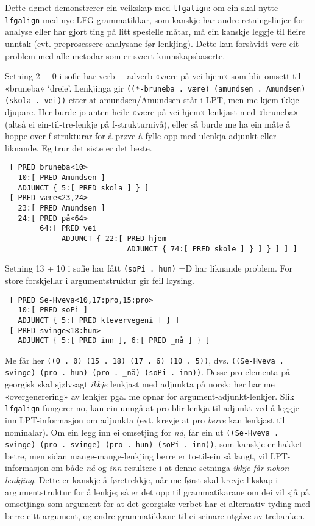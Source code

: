 \documentclass[11pt,a4paper,oneside,draft]{book}
\begin{document}
Dette dømet demonstrerer ein veikskap med \texttt{lfgalign}: om ein skal
nytte \texttt{lfgalign} med nye LFG-grammatikkar, som kanskje har andre
retningslinjer for analyse eller har gjort ting på litt spesielle
måtar, må ein kanskje leggje til fleire unntak (evt. preprosessere
analysane før lenkjing). Dette kan forsåvidt vere eit problem med alle
metodar som er svært kunnskapsbaserte.


Setning 2 + 0 i sofie har verb + adverb «være på vei hjem» som blir
omsett til «bruneba» `dreie'. Lenkjinga gir \texttt{((*-bruneba . være) (amundsen . Amundsen) (skola . vei))} etter at amundsen/Amundsen står
i LPT, men me kjem ikkje djupare. Her burde jo anten heile «være på
vei hjem» lenkjast med «bruneba» (altså ei ein-til-tre-lenkje på
f-strukturnivå), eller så burde me ha ein måte å hoppe over
f-strukturar for å prøve å fylle opp med ulenkja adjunkt eller
liknande. Eg trur det siste er det beste.

\begin{verbatim}
 [ PRED bruneba<10>
   10:[ PRED Amundsen ]
   ADJUNCT { 5:[ PRED skola ] } ]
 [ PRED være<23,24>
   23:[ PRED Amundsen ]
   24:[ PRED på<64>
        64:[ PRED vei
             ADJUNCT { 22:[ PRED hjem
                            ADJUNCT { 74:[ PRED skole ] } ] } ] ] ]
\end{verbatim}



Setning 13 + 10 i sofie har fått \texttt{(soPi . hun)} =D har liknande
problem. For store forskjellar i argumentstruktur gir feil løysing.

\begin{verbatim}
 [ PRED Se-Hveva<10,17:pro,15:pro>
   10:[ PRED soPi ]
   ADJUNCT { 5:[ PRED klevervegeni ] } ]
 [ PRED svinge<18:hun>
   ADJUNCT { 5:[ PRED inn ], 6:[ PRED _nå ] } ]
\end{verbatim}


Me får her \texttt{((0 . 0) (15 . 18) (17 . 6) (10 . 5))}, dvs. \texttt{((Se-Hveva . svinge) (pro . hun) (pro . \_nå) (soPi . inn))}. Desse pro-elementa
på georgisk skal sjølvsagt \emph{ikkje} lenkjast med adjunkta på norsk; her
har me «overgenerering» av lenkjer pga. me opnar for
argument-adjunkt-lenkjer. Slik \texttt{lfgalign} fungerer no, kan ein unngå
at pro blir lenkja til adjunkt ved å leggje inn LPT-informasjon om
adjunkta (evt. krevje at pro \emph{berre} kan lenkjast til nominalar). Om
ein legg inn ei omsetjing for \emph{nå}, får ein ut \texttt{((Se-Hveva . svinge) (pro . svinge) (pro . hun) (soPi . inn))}, som kanskje er hakket
betre, men sidan mange-mange-lenkjing berre er to-til-ein så langt,
vil LPT-informasjon om både \emph{nå} og \emph{inn} resultere i at denne
setninga \emph{ikkje får nokon lenkjing}. Dette er kanskje å føretrekkje,
når me først skal krevje likskap i argumentstruktur for å lenkje; så
er det opp til grammatikarane om dei vil sjå på omsetjinga som
argument for at det georgiske verbet har ei alternativ tyding med
berre eitt argument, og endre grammatikkane til ei seinare utgåve av
trebanken.
\end{document}
